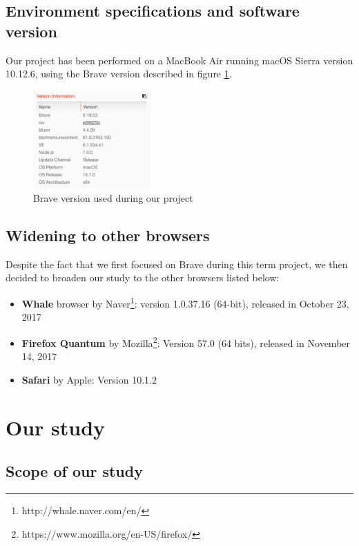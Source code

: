 \documentclass[journal]{IEEEtran}
\begin{document}
\subsection{Environment specifications and software version}

Our project has been performed on a MacBook Air running macOS Sierra version 10.12.6, using the Brave version described in figure \ref{fig:BraveVersion}.

\begin{figure}[h]
\centering
\includegraphics[width=0.4\textwidth]{images/BraveVersion.png}
\caption{Brave version used during our project}
\label{fig:BraveVersion}
\end{figure}


\subsection{Widening to other browsers}

Despite the fact that we first focused on Brave during this term project, we then decided to broaden our study to the other browsers listed below:

\begin{itemize}
\item \textbf{Whale} browser by Naver\footnote{http://whale.naver.com/en/}: version 1.0.37.16 (64-bit), released in October 23, 2017
\item \textbf{Firefox Quantum} by Mozilla\footnote{https://www.mozilla.org/en-US/firefox/}: Version 57.0 (64 bits), released in November 14, 2017
\item \textbf{Safari} by Apple: Version 10.1.2
\end{itemize}


\section{Our study}

\subsection{Scope of our study}
\end{document}
